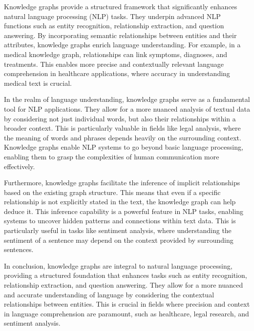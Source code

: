 \begin{itemize}

    Knowledge graphs provide a structured framework that significantly enhances natural language processing (NLP) tasks. They underpin advanced NLP functions such as entity recognition, relationship extraction, and question answering. By incorporating semantic relationships between entities and their attributes, knowledge graphs enrich language understanding. For example, in a medical knowledge graph, relationships can link symptoms, diagnoses, and treatments. This enables more precise and contextually relevant language comprehension in healthcare applications, where accuracy in understanding medical text is crucial.

    In the realm of language understanding, knowledge graphs serve as a fundamental tool for NLP applications. They allow for a more nuanced analysis of textual data by considering not just individual words, but also their relationships within a broader context. This is particularly valuable in fields like legal analysis, where the meaning of words and phrases depends heavily on the surrounding context. Knowledge graphs enable NLP systems to go beyond basic language processing, enabling them to grasp the complexities of human communication more effectively.

    Furthermore, knowledge graphs facilitate the inference of implicit relationships based on the existing graph structure. This means that even if a specific relationship is not explicitly stated in the text, the knowledge graph can help deduce it. This inference capability is a powerful feature in NLP tasks, enabling systems to uncover hidden patterns and connections within text data. This is particularly useful in tasks like sentiment analysis, where understanding the sentiment of a sentence may depend on the context provided by surrounding sentences.

    In conclusion, knowledge graphs are integral to natural language processing, providing a structured foundation that enhances tasks such as entity recognition, relationship extraction, and question answering. They allow for a more nuanced and accurate understanding of language by considering the contextual relationships between entities. This is crucial in fields where precision and context in language comprehension are paramount, such as healthcare, legal research, and sentiment analysis.


\end{itemize}
